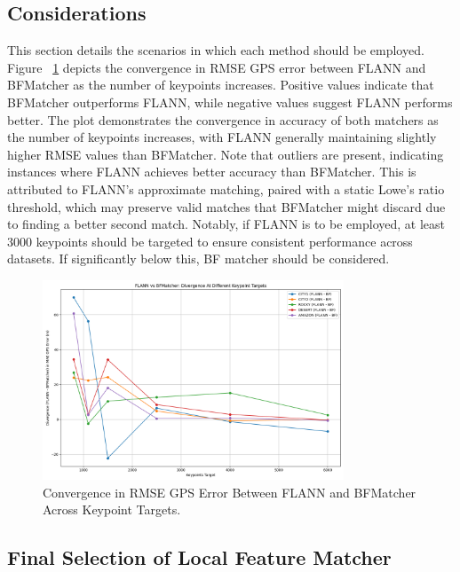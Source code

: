 \subsection{Considerations}
\label{sec:FLANN_BF_Considerations}
This section details the scenarios in which each method should be employed. Figure ~\ref{fig:FLANN BF Matcher Keypoint Convergence} depicts the convergence in RMSE GPS error between FLANN and BFMatcher as the number of keypoints increases. Positive values indicate that BFMatcher outperforms FLANN, while negative values suggest FLANN performs better. The plot demonstrates the convergence in accuracy of both matchers as the number of keypoints increases, with FLANN generally maintaining slightly higher RMSE values than BFMatcher. Note that outliers are present, indicating instances where FLANN achieves better accuracy than BFMatcher. This is attributed to FLANN's approximate matching, paired with a static Lowe's ratio threshold, which may preserve valid matches that BFMatcher might discard due to finding a better second match. Notably, if FLANN is to be employed, at least 3000 keypoints should be targeted to ensure consistent performance across datasets. If significantly below this, BF matcher should be considered. 

\begin{figure}[H]
    \centering
    \includegraphics[width=0.8\textwidth]{./Graphs/Divergence_BF_FLANN_KPS.png}
    \caption{Convergence in RMSE GPS Error Between FLANN and BFMatcher Across Keypoint Targets.}
    \label{fig:FLANN BF Matcher Keypoint Convergence} 
\end{figure}


\subsection{Final Selection of Local Feature Matcher}

